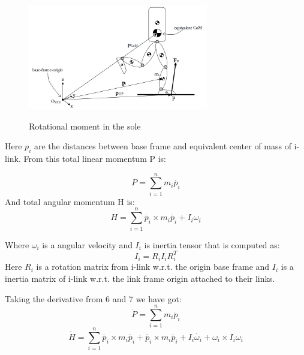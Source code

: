 \documentclass[11pt,a4paper]{article}
\begin{document}
	\begin{figure}[h!]
		\vspace{-0.2cm}
		\centering
		{\includegraphics[width=0.7\textwidth]{3}}
		\caption{Rotational moment in the sole \cite{dekker2009zero}}
		\label{fig:3}
		\vspace{-0.1cm}
	\end{figure}

Here $p_i$ are the distances between base frame and equivalent center of mass of i-link. From this total linear momentum P is:
	
	\begin{equation}
		P = \sum^n_{i=1}{m_i \dot{p_i}}
	\end{equation}
And total angular momentum H is:
	\begin{equation}
		H = \sum^n_{i=1}{\dot{p_i} \times m_i \dot{p_i} + I_i \omega_i}
	\end{equation}

Where $\omega_i$ is a angular velocity and $I_i$ is inertia tensor that is computed as:
	\begin{equation}
		I_i = R_i I_i R_i^T
	\end{equation}
Here $R_i$ is a rotation matrix from i-link w.r.t. the origin base frame and $I_i$ is a inertia matrix of i-link w.r.t. the link frame origin attached to their links.

Taking the derivative from 6 and 7 we have got:
	\begin{equation}
		\dot{P} = \sum^n_{i=1}{m_i \ddot{p_i}}
	\end{equation}
	\begin{equation}
		\dot{H} = \sum^n_{i=1}{\ddot{p_i} \times m_i \dot{p_i} + \dot{p_i} \times m_i \ddot{p_i} + I_i \dot{\omega_i}} + \omega_i \times I_i \omega_i
	\end{equation}
\end{document}
